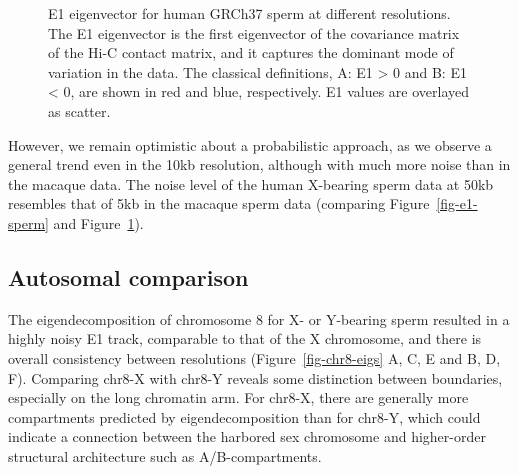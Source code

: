 \documentclass[
  10pt,
  a4paper,
  openany]{scrbook}
\begin{document}
\begin{figure}[htbp]
\begin{minipage}{\linewidth}
{}


\end{minipage}%

\caption{\label{fig-e1-sperm-x}E1 eigenvector for human GRCh37 sperm at
different resolutions. The E1 eigenvector is the first eigenvector of
the covariance matrix of the Hi-C contact matrix, and it captures the
dominant mode of variation in the data. The classical definitions, A: E1
\textgreater{} 0 and B: E1 \textless{} 0, are shown in red and blue,
respectively. E1 values are overlayed as scatter.}

\end{figure}%

However, we remain optimistic about a probabilistic approach, as we
observe a general trend even in the 10kb resolution, although with much
more noise than in the macaque data. The noise level of the human
X-bearing sperm data at 50kb resembles that of 5kb in the macaque sperm
data (comparing Figure~\ref{fig-e1-sperm} and
Figure~\ref{fig-e1-sperm-x}).

\subsection{Autosomal comparison}\label{autosomal-comparison}

The eigendecomposition of chromosome 8 for X- or Y-bearing sperm
resulted in a highly noisy E1 track, comparable to that of the X
chromosome, and there is overall consistency between resolutions
(Figure~\ref{fig-chr8-eigs} A, C, E and B, D, F). Comparing chr8-X with
chr8-Y reveals some distinction between boundaries, especially on the
long chromatin arm. For chr8-X, there are generally more compartments
predicted by eigendecomposition than for chr8-Y, which could indicate a
connection between the harbored sex chromosome and higher-order
structural architecture such as A/B-compartments.
\end{document}
